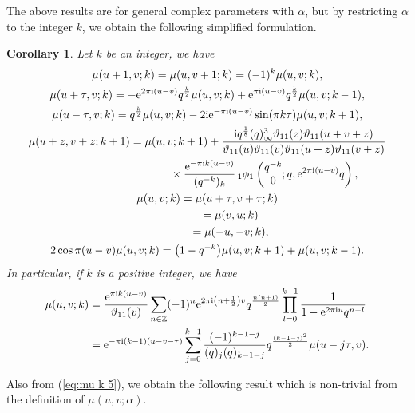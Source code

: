 \documentclass[pdftex]{sigma}
\numberwithin{equation}{section}
\newtheorem{cor}[thm]{Corollary}
\theoremstyle{definition}
\newcommand{\Zz}{\mathbb{Z}}
\begin{document}
The above results are for general complex parameters with $\alpha$, but by restricting $\alpha$ to the integer $k$, we obtain the following simplified formulation.
\begin{cor}\label{cor:Thm1 k}
Let $k$ be an integer, we have
\begin{gather}
\mu(u+1,v;k)
 =
 \mu(u,v+1;k)
 =
 (-1)^k\mu(u,v;k), \nonumber\\
\mu(u+\tau,v;k)
 =
 -{\rm e}^{2\pi{\rm i}(u-v)}q^\frac{k}{2}\mu(u,v;k)+{\rm e}^{\pi{\rm i}(u-v)}q^\frac{k}{2}\mu(u,v;k-1), \nonumber\\
\mu(u-\tau,v;k)
 =
 q^\frac{k}{2}\mu(u,v;k)
 -2{\rm i}{\rm e}^{-\pi{\rm i}(u-v)}\sin(\pi k \tau)\mu(u,v;k+1), \nonumber\\
\mu(u+z,v+z;k+1)
 =\mu(u,v;k+1) +\frac{{\rm i} q^{\frac{1}{8}}(q)_{\infty }^{3}\vartheta_{11}(z)\vartheta_{11}(u+v+z)}{\vartheta_{11}(u)\vartheta_{11}(v)\vartheta_{11}(u+z)\vartheta_{11}(v+z)} \nonumber \\
\hphantom{\mu(u+z,v+z;k+1)=}{}
\times \frac{{\rm e}^{-\pi{\rm i}k(u-v)}}{(q^{-k})_k}\,{}_1\phi_1\left(\begin{matrix}q^{-k}\\0\end{matrix};q,{\rm e}^{2\pi{\rm i}(u-v)}q\right), \nonumber\\
\mu(u,v;k) =
 \mu(u+\tau,v+\tau;k)\nonumber \\
\hphantom{\mu(u,v;k)}{}
=
 \mu(v,u;k) \nonumber\\
\hphantom{\mu(u,v;k)}{} =
 \mu(-u,-v;k), \nonumber\\
\label{eq:mu k 5}
2\cos\pi(u-v)\mu(u,v;k)
 =
 \big(1-q^{-k}\big)\mu(u,v;k+1)+\mu(u,v;k-1).
\end{gather}
In particular, if $k$ is a positive integer, we have
\begin{align}%
\mu(u,v;k)
 &=
 \frac{{\rm e}^{\pi{\rm i}k(u-v)}}{\vartheta_{11}(v)}\sum_{n\in\Zz}(-1)^n{\rm e}^{2\pi{\rm i}\left(n+\frac{1}{2}\right)v}q^\frac{n(n+1)}{2}\prod_{l=0}^{k-1}\frac{1}{1-{\rm e}^{2\pi{\rm i}u}q^{n-l}} \nonumber\\
\label{eq:mu k 7}
 &=
 {\rm e}^{-\pi{\rm i}(k-1)(u-v-\tau)}\sum_{j=0}^{k-1}\frac{(-1)^{k-1-j}}{(q)_j(q)_{k-1-j}}q^\frac{(k-1-j)^2}{2}\mu(u-j\tau,v).
\end{align}
\end{cor}
Also from (\ref{eq:mu k 5}), we obtain the following result which is non-trivial from the definition of $\mu(u,v;\alpha )$.
\end{document}
